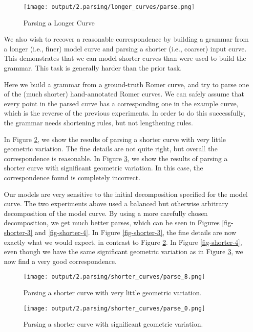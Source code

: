 \begin{figure}
\texttt{[image: output/2.parsing/longer\_curves/parse.png]}
\caption{Parsing a Longer Curve}
\label{fig-longer}
\end{figure}

We also wish to recover a reasonable correspondence by building a
grammar from a longer (i.e., finer) model curve and parsing a shorter
(i.e., coarser) input curve. This demonstrates that we can model
shorter curves than were used to build the grammar. This task is
generally harder than the prior task.

Here we build a grammar from a ground-truth Romer curve, and try to
parse one of the (much shorter) hand-annotated Romer curves. We can
safely assume that every point in the parsed curve has a corresponding
one in the example curve, which is the reverse of the previous
experiments. In order to do this successfully, the grammar needs
shortening rules, but not lengthening rules.

In Figure \ref{fig-shorter-1}, we show the results of parsing a
shorter curve with very little geometric variation. The fine details
are not quite right, but overall the correspondence is reasonable. In
Figure \ref{fig-shorter-2}, we show the results of parsing a shorter
curve with significant geometric variation. In this case, the
correspondence found is completely incorrect.

Our models are very sensitive to the initial decomposition specified
for the model curve. The two experiments above used a balanced but
otherwise arbitrary decomposition of the model curve. By using a more
carefully chosen decomposition, we get much better parses, which can
be seen in Figures \ref{fig-shorter-3} and \ref{fig-shorter-4}. In
Figure \ref{fig-shorter-3}, the fine details are now exactly what we
would expect, in contrast to Figure \ref{fig-shorter-1}. In Figure
\ref{fig-shorter-4}, even though we have the same significant
geometric variation as in Figure \ref{fig-shorter-2}, we now find a
very good correspondence.

\begin{figure}
\texttt{[image: output/2.parsing/shorter\_curves/parse\_8.png]}
\caption{Parsing a shorter curve with very little geometric variation.}
\label{fig-shorter-1}
\end{figure}

\begin{figure}
\texttt{[image: output/2.parsing/shorter\_curves/parse\_0.png]}
\caption{Parsing a shorter curve with significant geometric
  variation. }
\label{fig-shorter-2}
\end{figure}

